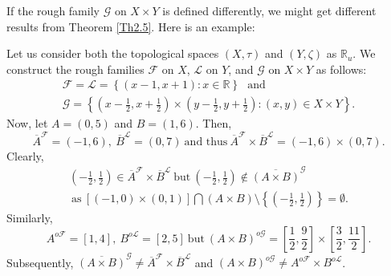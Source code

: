 \documentclass[11pt]{amsart}
\begin{document}
If the rough family $\mathcal{G}$ on $X\times Y$ is defined differently, we might get different results from Theorem \ref{Th2.5}. Here is an example:

\begin{example}
    Let us consider both the topological spaces $(X,\tau)$ and $(Y,\zeta)$ as $\mathbb{R}_u$. We construct the rough families $\mathscr{F}$ on $X$, $\mathscr{L}$ on $Y$, and $\mathcal{G}$ on $X\times Y$ as follows:
    \begin{multline*}
     \mathscr{F}=\mathscr{L}=\left\{(x-1,x+1):x\in \mathbb{R}\right\}~~~\text{and}~~~\\\mathcal{G}=\left\{\left(x-\frac{1}{2},x+\frac{1}{2}\right)\times\left(y-\frac{1}{2},y+\frac{1}{2}\right): (x,y)\in X\times Y\right\}.
    \end{multline*}
    Now, let $A=(0,5)$ and $B=(1,6)$. Then, $$\overline{A}^\mathscr{F}=(-1,6),~\overline{B}^\mathscr{L}=(0,7)~\text{and thus}~ \overline{A}^\mathscr{F}\times \overline{B}^\mathscr{L}=(-1,6)\times(0,7).$$
    Clearly, \begin{multline*}
        \left(-\frac{1}{2},\frac{1}{2}\right)\in \overline{A}^\mathscr{F}\times \overline{B}^\mathscr{L}~\text{but}~\left(-\frac{1}{2},\frac{1}{2}\right)\notin \overline{(A\times B)}^\mathcal{G}\\~\text{as}~\left[\left(-1,0\right)\times (0,1)\right]\bigcap (A\times B)\setminus\left\{\left(-\frac{1}{2},\frac{1}{2}\right)\right\}=\emptyset.
    \end{multline*}
    Similarly, 
    $$A^{o\mathscr{F}}=[1,4],~B^{o\mathscr{L}}=[2,5]~\text{but}~(A\times B)^{o\mathcal{G}}=
    \left[\frac{1}{2},\frac{9}{2}\right]\times \left[\frac{3}{2},\frac{11}{2}\right].$$
    Subsequently, $\overline{(A\times B)}^\mathcal{G}\neq \overline{A}^\mathscr{F}\times \overline{B}^\mathscr{L}$ and $(A\times B)^{o\mathcal{G}}\neq A^{o\mathscr{F}}\times B^{o\mathscr{L}}$.
\end{example}
\end{document}
